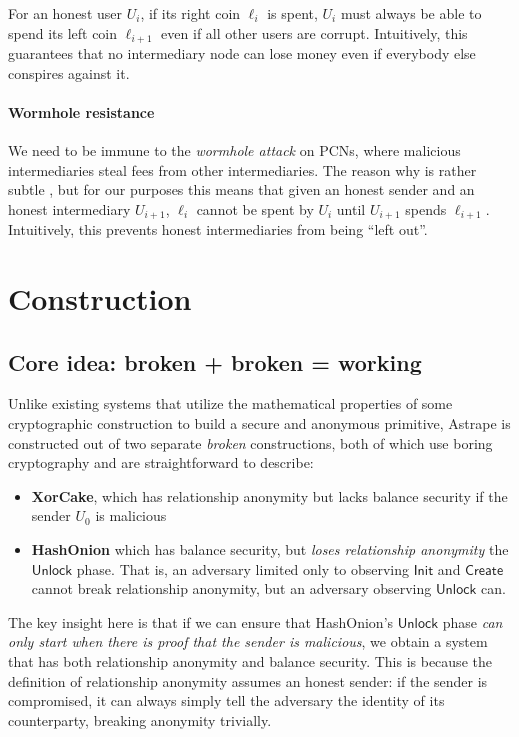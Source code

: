 \documentclass[USenglish,oneside,twocolumn]{article}
\begin{document}
For an honest user $U_i$, if its right coin $\ell_i$ is spent, $U_i$ must always be able to spend its left coin $\ell_{i+1}$ even if all other users are corrupt. Intuitively, this guarantees that no intermediary node can lose money even if everybody else conspires against it.

\paragraph*{Wormhole resistance}

We need to be immune to the \emph{wormhole attack} on PCNs, where malicious intermediaries steal fees from other intermediaries. The reason why is rather subtle \cite{malavolta2019anonymous}, but for our purposes this means that given an honest sender and an honest intermediary $U_{i+1}$, $\ell_i$ cannot be spent by $U_i$ until $U_{i+1}$ spends $\ell_{i+1}$.  Intuitively, this prevents honest intermediaries from being ``left out''.


\section{Construction} \label{sec:construct}

\subsection{Core idea: broken + broken = working}

Unlike existing systems that utilize the mathematical properties of some cryptographic construction to build a secure and anonymous primitive, Astrape is constructed out of two separate \emph{broken} constructions, both of which use boring cryptography and are straightforward to describe:
\begin{itemize}
    \item \textbf{XorCake}, which has relationship anonymity but lacks balance security if the sender $U_0$ is malicious
    \item \textbf{HashOnion} which has balance security, but \emph{loses relationship anonymity} the $\mathsf{Unlock}$ phase. That is, an adversary limited only to observing $\mathsf{Init}$ and $\mathsf{Create}$ cannot break relationship anonymity, but an adversary observing $\mathsf{Unlock}$ can.
\end{itemize}

The key insight here is that if we can ensure that HashOnion's $\mathsf{Unlock}$ phase \emph{can only start when there is proof that the sender is malicious}, we obtain a system that has both relationship anonymity and balance security. This is because the definition of relationship anonymity assumes an honest sender: if the sender is compromised, it can always simply tell the adversary the identity of its counterparty, breaking anonymity trivially.
\end{document}
